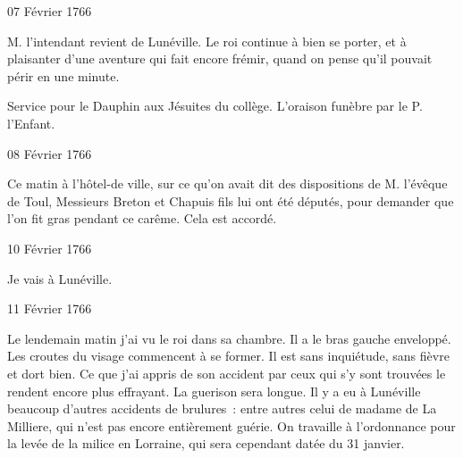                      \begin{diary}{07 Février 1766}{}
                        
                        
                           M. l'intendant revient de
                              Lunéville. Le
                              roi continue à bien se porter, et à plaisanter
                           d'une aventure qui fait encore frémir, quand
                           on pense qu'il pouvait périr en une minute. \bigskip
        
        
                         Service pour le Dauphin aux Jésuites du collège. L'oraison funèbre par le P. l'Enfant. \bigskip
        
        
                     \end{diary}

                     \begin{diary}{08 Février 1766}{}
                        
                         Ce matin à l'hôtel-de ville, sur ce qu'on avait
                           dit des dispositions de M.
                              l'évêque de Toul, Messieurs
                           Breton et Chapuis fils lui ont été députés,
                           pour demander que l'on fit gras pendant
                           ce carême. Cela est accordé. \bigskip
        
        
                     \end{diary}

                     \begin{diary}{10 Février 1766}{}
                        
                         Je vais à Lunéville. \bigskip
        
        
                     \end{diary}

                     \begin{diary}{11 Février 1766}{}
                        
                         Le lendemain matin j'ai vu
                              le roi dans
                           sa chambre. Il a le bras gauche enveloppé.
                           Les croutes du visage commencent à se former.
                           Il est sans inquiétude, sans fièvre et dort bien. Ce que j'ai appris de son accident par ceux qui
                           s'y sont trouvées le rendent encore plus effrayant.
                           La guerison sera longue. Il y a eu à Lunéville
                           beaucoup d'autres accidents de brulures :
                           entre autres celui de madame de La Milliere, qui
                           n'est pas encore entièrement guérie.
                           On travaille à l'ordonnance pour la levée de
                           la milice en Lorraine, qui sera cependant
                           datée du 31 janvier. \bigskip
        
        
                     \end{diary}

